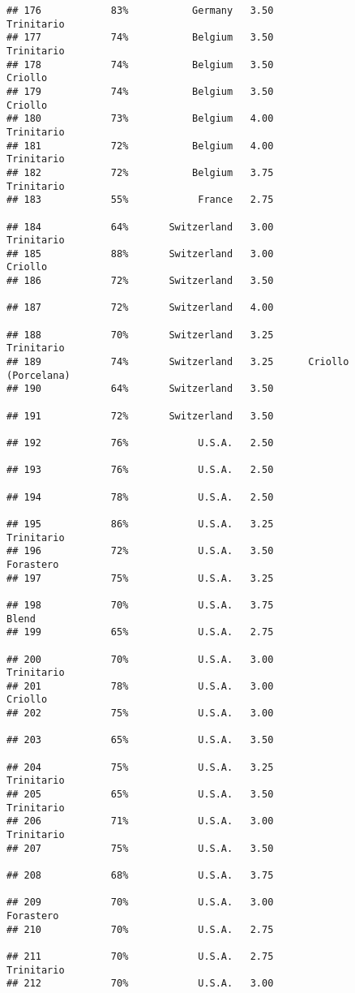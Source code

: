 \documentclass[
]{article}
\begin{document}
\begin{verbatim}
## 176            83%           Germany   3.50               Trinitario
## 177            74%           Belgium   3.50               Trinitario
## 178            74%           Belgium   3.50                  Criollo
## 179            74%           Belgium   3.50                  Criollo
## 180            73%           Belgium   4.00               Trinitario
## 181            72%           Belgium   4.00               Trinitario
## 182            72%           Belgium   3.75               Trinitario
## 183            55%            France   2.75                         
## 184            64%       Switzerland   3.00               Trinitario
## 185            88%       Switzerland   3.00                  Criollo
## 186            72%       Switzerland   3.50                         
## 187            72%       Switzerland   4.00                         
## 188            70%       Switzerland   3.25               Trinitario
## 189            74%       Switzerland   3.25      Criollo (Porcelana)
## 190            64%       Switzerland   3.50                         
## 191            72%       Switzerland   3.50                         
## 192            76%            U.S.A.   2.50                         
## 193            76%            U.S.A.   2.50                         
## 194            78%            U.S.A.   2.50                         
## 195            86%            U.S.A.   3.25               Trinitario
## 196            72%            U.S.A.   3.50                Forastero
## 197            75%            U.S.A.   3.25                         
## 198            70%            U.S.A.   3.75                    Blend
## 199            65%            U.S.A.   2.75                         
## 200            70%            U.S.A.   3.00               Trinitario
## 201            78%            U.S.A.   3.00                  Criollo
## 202            75%            U.S.A.   3.00                         
## 203            65%            U.S.A.   3.50                         
## 204            75%            U.S.A.   3.25               Trinitario
## 205            65%            U.S.A.   3.50               Trinitario
## 206            71%            U.S.A.   3.00               Trinitario
## 207            75%            U.S.A.   3.50                         
## 208            68%            U.S.A.   3.75                         
## 209            70%            U.S.A.   3.00                Forastero
## 210            70%            U.S.A.   2.75                         
## 211            70%            U.S.A.   2.75               Trinitario
## 212            70%            U.S.A.   3.00                         

\end{verbatim}
\end{document}
